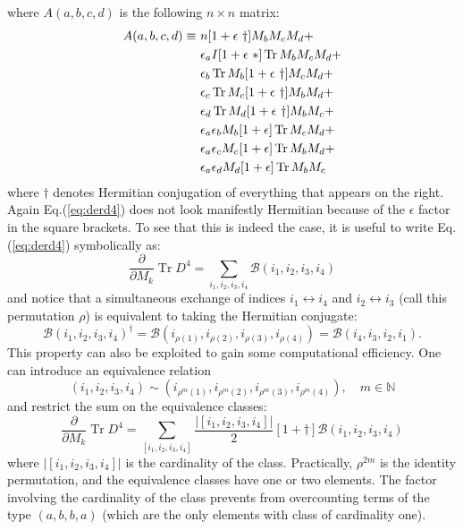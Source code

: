 \documentclass[12pt,a4paper]{article}
\DeclareMathOperator{\Tr}{Tr}
\begin{document}
where $A(a, b, c, d )$ is the following $n \times n$ matrix:
\begin{align}
A(a,b,c,d) \equiv \ &n [1+\epsilon \ \dagger] M_b M_c M_d + \notag \\
&\epsilon_a I [1 + \epsilon \ *] \Tr M_b M_c M_d  + \notag \\
&\epsilon_b \Tr M_b [1 + \epsilon \ \dagger] M_c M_d + \notag \\
&\epsilon_c \Tr M_c [1 + \epsilon \ \dagger] M_b M_d + \notag \\
&\epsilon_d \Tr M_d [1 + \epsilon \ \dagger] M_b M_c + \notag \\
&\epsilon_a \epsilon_b M_b [1 + \epsilon] \Tr M_c M_d + \notag \\
&\epsilon_a \epsilon_c M_c [1 + \epsilon] \Tr M_b M_d + \notag \\
&\epsilon_a \epsilon_d M_d [1 + \epsilon] \Tr M_b M_c
\end{align}
where $\dagger$ denotes Hermitian conjugation of everything that appears on the right. Again Eq.(\ref{eq:derd4}) does not look manifestly Hermitian because of the $\epsilon$ factor in the square brackets. To see that this is indeed the case, it is useful to write Eq.(\ref{eq:derd4}) symbolically as:
\begin{equation}
\frac{\partial}{\partial M_k} \Tr D^4 = \sum_{i_1, i_2, i_3, i_4} \mathcal{B}(i_1, i_2, i_3, i_4)
\end{equation}
and notice that a simultaneous exchange of indices $i_1 \leftrightarrow i_4$ and $i_2 \leftrightarrow i_3$ (call this permutation $\rho$) is equivalent to taking the Hermitian conjugate:
\begin{equation}\label{eq:BBd}
\mathcal{B}(i_1, i_2, i_3, i_4)^{\dagger} = \mathcal{B}(i_{\rho(1)}, i_{\rho(2)}, i_{\rho(3)}, i_{\rho(4)}) = \mathcal{B}(i_4, i_3, i_2, i_1).
\end{equation}
This property can also be exploited to gain some computational efficiency. One can introduce an equivalence relation
\begin{equation}
(i_1, i_2, i_3, i_4) \sim (i_{\rho^m(1)}, i_{\rho^m(2)}, i_{\rho^m(3)}, i_{\rho^m(4)}), \quad m \in \mathbb{N}
\end{equation}
and restrict the sum on the equivalence classes:
\begin{equation}\label{eq:trunc}
\frac{\partial}{\partial M_k} \Tr D^4 = \sum_{[i_1, i_2, i_3, i_4]} \frac{|[i_1, i_2, i_3, i_4]|}{2} [1+\dagger]\mathcal{B}(i_1, i_2, i_3, i_4)
\end{equation}
where $|[i_1, i_2, i_3, i_4]|$ is the cardinality of the class. Practically, $\rho^{2m}$ is the identity permutation, and the equivalence classes have one or two elements. The factor involving the cardinality of the class prevents from overcounting terms of the type $(a, b, b, a)$ (which are the only elements with class of cardinality one).\newline
\end{document}
